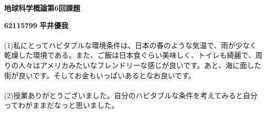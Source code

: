 \documentclass[a4paper,10.5pt]{ltjsarticle}
\begin{document}
\centerline
{\huge \bfseries 地球科学概論第6回課題}
\leftline
{\bfseries 62115799}
{\bfseries 平井優我}\\
\\
(1)私にとってハビタブルな環境条件は、日本の春のような気温で、雨が少なく乾燥した環境である。また、ご飯は日本食ぐらい美味しく、トイレも綺麗で、周りの人々はアメリカみたいなフレンドリーな感じが良いです。あと、海に面した街が良いです。そしてお金もいっぱいあるとなお良いです。
\\
\\
(2)授業ありがとうございました。自分のハビタブルな条件を考えてみると自分ってわがままだなっと思いました。
\end{document}

